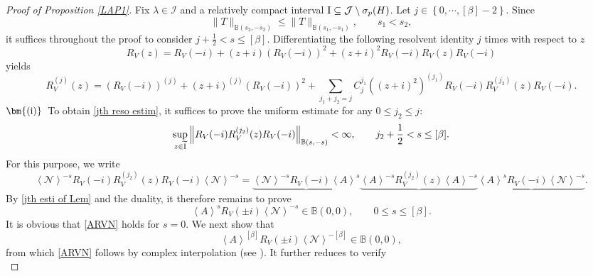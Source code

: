\documentclass[reqno, 11pt]{amsart}
\newcommand\B{\mathbb{B}}
\newcommand\mcaI{\mathcal{I}}
\newcommand\mcaJ{\mathcal{J}}
\newcommand\mcaN{\mathcal{N}}
\numberwithin{equation}{section}
\begin{document}
\begin{proof}[Proof of Proposition \ref{LAP1}]
Fix $\lambda\in\mcaI$ and a relatively compact interval ${\rm I}\subseteq\mcaJ\setminus\sigma_{p}(H)$. Let $j\in\left\{0,\cdots,[\beta]-2\right\}$.  Since
\begin{equation}\label{increase of weighted space}
    \|T\|_{\B(s_2,-s_2)}\leq \|T\|_{\B(s_1,-s_1)},\qquad s_1<s_2, 
\end{equation}
it suffices throughout the proof to consider $j+\frac{1}{2}<s\leq [\beta]$. Differentiating the following resolvent identity $j$ times with respect to $z$
 \begin{equation*}
 R_V(z)=R_V(-i)+(z+i)(R_V(-i))^2+(z+i)^2R_V(-i)R_V(z)R_V(-i)
 \end{equation*}
 yields
 \begin{equation*}
 R^{(j)}_V(z)=(R_V(-i))^{(j)}+(z+i)^{(j)}(R_V(-i))^2+\sum\limits_{j_1+j_2=j}C^{j_1}_j((z+i)^2)^{(j_1)}R_V(-i)R^{(j_2)}_V(z)R_V(-i).
 \end{equation*}
 \vskip0.1cm
 \underline{$\bm{({\rm i})}$}~To obtain \eqref{jth reso estim}, it suffices to prove the uniform estimate for any $0\leq j_2\leq j$:
 \begin{equation}\label{R(-i)R(z)R(-i)}
\sup\limits_{z\in\widetilde{\rm I}}\left\|R_V(-i)R^{(j_2)}_V(z)R_V(-i)\right\|_{\B(s,-s)}<\infty, \qquad j_2+\frac{1}{2}<s\leq [\beta].
 \end{equation} 
For this purpose, we write
 \begin{equation*}
 \left<\mcaN\right>^{-s}R_V(-i)R^{(j_2)}_V(z)R_V(-i)\left<\mcaN\right>^{-s}=\underbrace{\left<\mcaN\right>^{-s}R_V(-i)\left<A\right>^{s}}\underbrace{\left<A\right>^{-s}R^{(j_2)}_V(z)\left<A\right>^{-s}}\underbrace{\left<A\right>^{s}R_V(-i)\left<\mcaN\right>^{-s}}.
 \end{equation*}
By \eqref{jth esti of Lem} and the duality, it therefore remains to prove
 \begin{equation}\label{ARVN}
 \left<A\right>^{s}R_V(\pm i)\left<\mcaN\right>^{-s}\in\B(0,0),\qquad 0\leq s\leq[\beta].
 \end{equation}
It is obvious that \eqref{ARVN} holds for $s=0$. We next show that
 \begin{equation*}
\left<A\right>^{[\beta]}R_V(\pm i)\left<\mcaN\right>^{-[\beta]}\in\B(0,0),
 \end{equation*}
from which \eqref{ARVN} follows by complex interpolation (see
\cite[Lemma 8.2]{PSS81}). It further reduces to verify
 \begin{equation}\label{ell}

\end{equation}
\end{proof}
\end{document}

